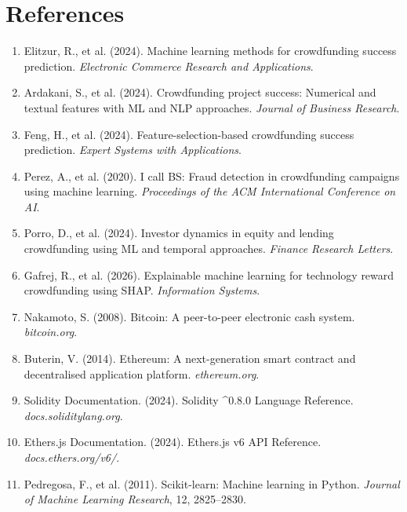 \chapter*{References}

\begin{enumerate}

    \item Elitzur, R., et al. (2024). Machine learning methods for crowdfunding success prediction. \textit{Electronic Commerce Research and Applications}.

    \item Ardakani, S., et al. (2024). Crowdfunding project success: Numerical and textual features with ML and NLP approaches. \textit{Journal of Business Research}.

    \item Feng, H., et al. (2024). Feature-selection-based crowdfunding success prediction. \textit{Expert Systems with Applications}.

    \item Perez, A., et al. (2020). I call BS: Fraud detection in crowdfunding campaigns using machine learning. \textit{Proceedings of the ACM International Conference on AI}.

    \item Porro, D., et al. (2024). Investor dynamics in equity and lending crowdfunding using ML and temporal approaches. \textit{Finance Research Letters}.

    \item Gafrej, R., et al. (2026). Explainable machine learning for technology reward crowdfunding using SHAP. \textit{Information Systems}.

    \item Nakamoto, S. (2008). Bitcoin: A peer-to-peer electronic cash system. \textit{bitcoin.org}.

    \item Buterin, V. (2014). Ethereum: A next-generation smart contract and decentralised application platform. \textit{ethereum.org}.

    \item Solidity Documentation. (2024). Solidity \^{}0.8.0 Language Reference. \textit{docs.soliditylang.org}.

    \item Ethers.js Documentation. (2024). Ethers.js v6 API Reference. \textit{docs.ethers.org/v6/}.

    \item Pedregosa, F., et al. (2011). Scikit-learn: Machine learning in Python. \textit{Journal of Machine Learning Research}, 12, 2825--2830.


\end{enumerate}

